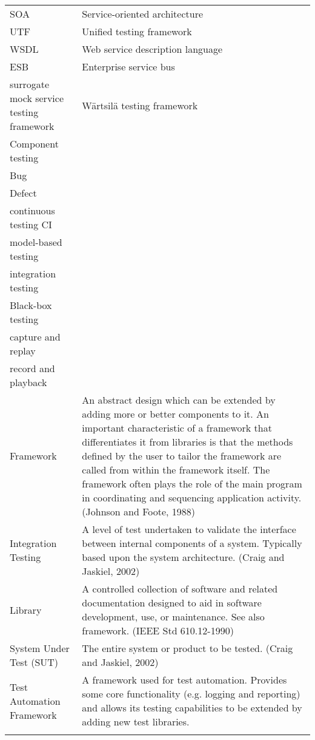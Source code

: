 \documentclass[12pt,a4paper,oneside,pdftex]{report}
\begin{document}
\noindent
\begin{longtable}{@{}p{}p{}@{}}
SOA & Service-oriented architecture \\
UTF & Unified testing framework \\
WSDL & Web service description language \\
ESB & Enterprise service bus\\
surrogate
mock service
testing framework

\begin{comment}
WTF & Wärtsilä testing framework \\
Component testing & \\
Bug & \\
Defect & \\
continuous testing CI \\
model-based testing \\
integration testing \\
Black-box testing & \\
capture and replay & \\
record and playback & \\
Framework & An abstract design which can be extended by adding more or better components to it. An important characteristic of a framework that differentiates it from libraries is that the methods defined by the user to tailor the framework are called from within the framework itself. The framework often plays the role of the main program in coordinating and sequencing application activity. (Johnson and Foote, 1988) \\
Integration Testing & A level of test undertaken to validate the interface between internal components of a system. Typically based upon the system architecture. (Craig and Jaskiel, 2002) \\
Library & A controlled collection of software and related documentation designed to aid in software development, use, or maintenance. See also framework. (IEEE Std 610.12-1990) \\
System Under Test (SUT) & The entire system or product to be tested. (Craig and Jaskiel, 2002) \\
Test Automation Framework & A framework used for test automation. Provides some core functionality (e.g. logging and reporting) and allows its testing capabilities to be extended by adding new test libraries. \\

\end{comment}
\end{longtable}
\end{document}

